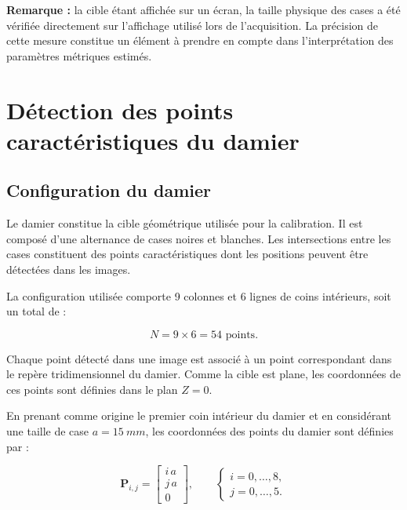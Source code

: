 \documentclass[12pt,a4paper]{report}
\begin{document}
\textbf{Remarque :} la cible étant affichée sur un écran,
la taille physique des cases a été vérifiée directement
sur l'affichage utilisé lors de l'acquisition. La
précision de cette mesure constitue un élément à
prendre en compte dans l'interprétation des
paramètres métriques estimés.


\chapter{Détection des points caractéristiques du damier}

\section{Configuration du damier}

Le damier constitue la cible géométrique utilisée
pour la calibration. Il est composé d'une alternance
de cases noires et blanches. Les intersections entre
les cases constituent des points caractéristiques
dont les positions peuvent être détectées dans les
images.

La configuration utilisée comporte 9 colonnes et
6 lignes de coins intérieurs, soit un total de :

\begin{equation}
    N = 9 \times 6 = 54 \text{ points}.
\end{equation}

Chaque point détecté dans une image est associé à
un point correspondant dans le repère tridimensionnel
du damier. Comme la cible est plane, les coordonnées
de ces points sont définies dans le plan $Z=0$.

En prenant comme origine le premier coin intérieur
du damier et en considérant une taille de case
$a = \SI{15}{mm}$, les coordonnées des points
du damier sont définies par :

\begin{equation}
    \mathbf{P}_{i,j} =
    \begin{bmatrix}
        i\,a \\
        j\,a \\
        0
    \end{bmatrix},
    \qquad
    \begin{cases}
        i = 0,\ldots,8,\\
        j = 0,\ldots,5.
    \end{cases}
\end{equation}
\end{document}
